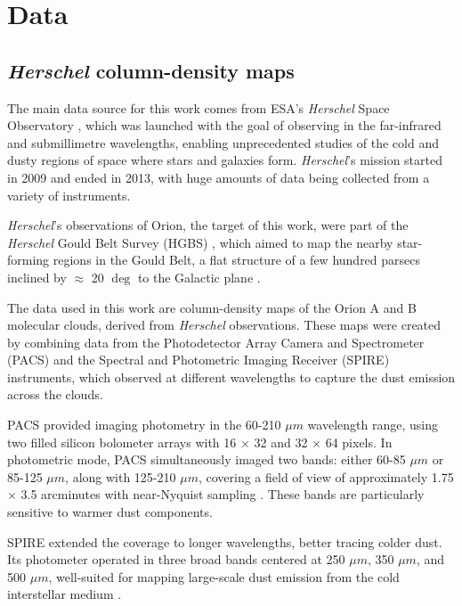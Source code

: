 \chapter{Data}
\label{chap:data}

\section{\textit{Herschel} column-density maps}
The main data source for this work comes from ESA's \textit{Herschel} Space Observatory \cite{pilbratt2010herschel}, which was launched with the goal of observing in the far-infrared and submillimetre wavelengths, enabling unprecedented studies of the cold and dusty regions of space where stars and galaxies form.
\textit{Herschel}'s mission started in 2009 and ended in 2013, with huge amounts of data being collected from a variety of instruments.

\textit{Herschel}'s observations of Orion, the target of this work, were part of the \textit{Herschel} Gould Belt Survey (HGBS) , which aimed to map the nearby star-forming regions in the Gould Belt, a flat structure of a few hundred parsecs inclined by $\approx$ 20 $\deg$ to the Galactic plane \cite{andre2010herschel}.

The data used in this work are column-density maps of the Orion A and B molecular clouds, derived from \textit{Herschel} observations. These maps were created by combining data from the Photodetector Array Camera and Spectrometer (PACS) and the Spectral and Photometric Imaging Receiver (SPIRE) instruments, which observed at different wavelengths to capture the dust emission across the clouds.


PACS provided imaging photometry in the 60-210 $\mu m$ wavelength range, using two filled silicon bolometer arrays with 16 $\times$ 32 and 32 $\times$ 64 pixels. In photometric mode, PACS simultaneously imaged two bands: either 60-85 $\mu m$ or 85-125 $\mu m$, along with 125-210 $\mu m$, covering a field of view of approximately 1.75 $\times$ 3.5 arcminutes with near-Nyquist sampling \cite{poglitsch2010photodetector}. These bands are particularly sensitive to warmer dust components.

SPIRE extended the coverage to longer wavelengths, better tracing colder dust. Its photometer operated in three broad bands centered at 250 $\mu m$, 350 $\mu m$, and 500 $\mu m$, well-suited for mapping large-scale dust emission from the cold interstellar medium \cite{griffin2010herschel}. 

